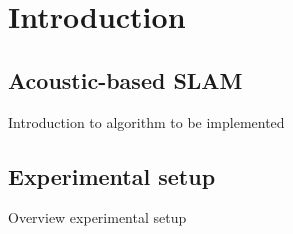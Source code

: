 \section{Introduction}

\subsection{Acoustic-based SLAM}

Introduction to algorithm to be implemented

\subsection{Experimental setup}

Overview experimental setup 

